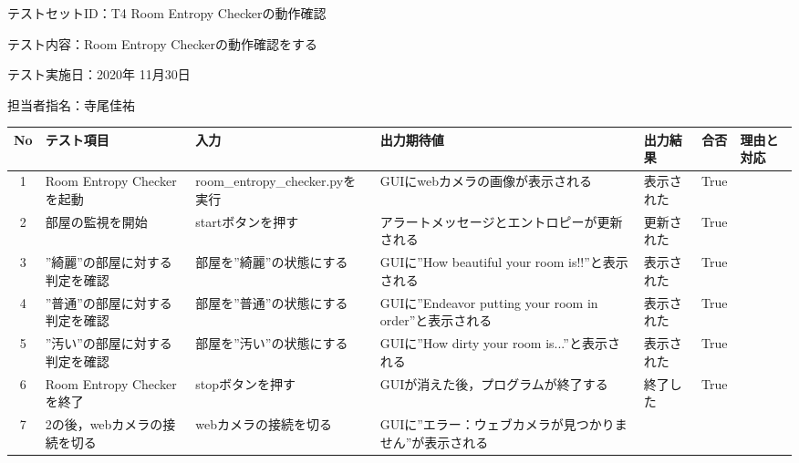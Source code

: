 テストセットID：T4 Room Entropy Checkerの動作確認

テスト内容：Room Entropy Checkerの動作確認をする

テスト実施日：2020年 11月30日

担当者指名：寺尾佳祐


\begin{table}[H]
    \centering
    \begin{tabular}{|c|p{11em}|p{11em}|p{7em}|p{6em}|c|p{5em}|} \hline
        No & テスト項目 & 入力 & 出力期待値 & 出力結果 & 合否 & 理由と対応 \\ \hline
        1 & Room Entropy Checkerを起動 & room\_entropy\_checker.pyを実行 & GUIにwebカメラの画像が表示される & 表示された & True & \\ \hline
        2 & 部屋の監視を開始 & startボタンを押す & アラートメッセージとエントロピーが更新される & 更新された & True & \\ \hline
        3 & ”綺麗”の部屋に対する判定を確認 & 部屋を”綺麗”の状態にする & GUIに”How beautiful your room is!!”と表示される & 表示された & True & \\ \hline
        4 & ”普通”の部屋に対する判定を確認 & 部屋を”普通”の状態にする & GUIに”Endeavor putting your room in order”と表示される & 表示された & True & \\ \hline
        5 & ”汚い”の部屋に対する判定を確認 & 部屋を”汚い”の状態にする & GUIに”How dirty your room is...”と表示される & 表示された & True & \\ \hline
        6 & Room Entropy Checkerを終了 & stopボタンを押す & GUIが消えた後，プログラムが終了する & 終了した & True & \\ \hline
        7 & 2の後，webカメラの接続を切る & webカメラの接続を切る & GUIに”エラー：ウェブカメラが見つかりません”が表示される &  &  & \\ \hline
    \end{tabular}
    \label{tab:test_set1}
\end{table}